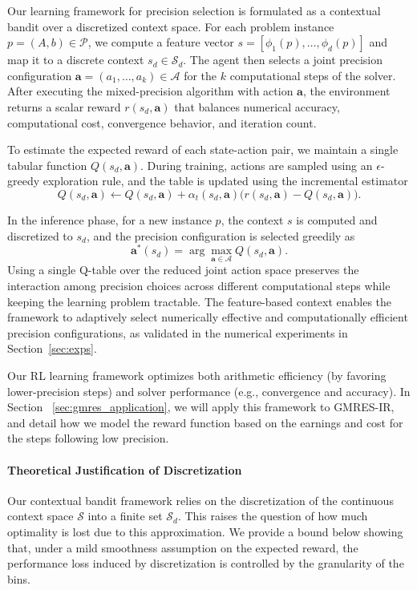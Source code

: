 \documentclass[Afour,sageh,times]{sagej}
\theoremstyle{plain}
\theoremstyle{definition}
\begin{document}
Our learning framework for precision selection is formulated as a contextual bandit over a discretized context space. For each problem instance $p=(A,b)\in\mathcal{P}$, we compute a feature vector $s=[\phi_1(p),\ldots,\phi_d(p)]$ and map it to a discrete context $s_d\in\mathcal{S}_d$. The agent then selects a joint precision configuration $\mathbf{a}=(a_1,\ldots,a_k)\in\mathcal{A}$ for the $k$ computational steps of the solver. After executing the mixed-precision algorithm with action $\mathbf{a}$, the environment returns a scalar reward $r(s_d,\mathbf{a})$ that balances numerical accuracy, computational cost, convergence behavior, and iteration count.

To estimate the expected reward of each state-action pair, we maintain a single tabular function $Q(s_d,\mathbf{a})$. During training, actions are sampled using an $\epsilon$-greedy exploration rule, and the table is updated using the incremental estimator
\[
Q(s_d,\mathbf{a})\leftarrow Q(s_d,\mathbf{a})+\alpha_t(s_d,\mathbf{a})\big(r(s_d,\mathbf{a})-Q(s_d,\mathbf{a})\big).
\]


In the inference phase, for a new instance $p$, the context $s$ is computed and discretized to $s_d$, and the precision configuration is selected greedily as
\[
\mathbf{a}^*(s_d)=\arg\max_{\mathbf{a}\in\mathcal{A}} Q(s_d,\mathbf{a}).
\]
Using a single Q-table over the reduced joint action space preserves the interaction among precision choices across different computational steps while keeping the learning problem tractable. The feature-based context enables the framework to adaptively select numerically effective and computationally efficient precision configurations, as validated in the numerical experiments in Section~\ref{sec:exps}.


Our RL learning framework optimizes both arithmetic efficiency (by favoring lower-precision steps) and solver performance (e.g., convergence and accuracy). In Section~
\ref{sec:gmres_application}, we will apply this framework to GMRES-IR, and detail how we model the reward function based on the earnings and cost for the steps following low precision.


\paragraph{Theoretical Justification of Discretization}
Our contextual bandit framework relies on the discretization of the continuous context space $\mathcal{S}$ into a finite set $\mathcal{S}_d$. This raises the question of how much optimality is lost due to this approximation. We provide a bound below showing that, under a mild smoothness assumption on the expected reward, the performance loss induced by discretization is controlled by the granularity of the bins.
\end{document}
